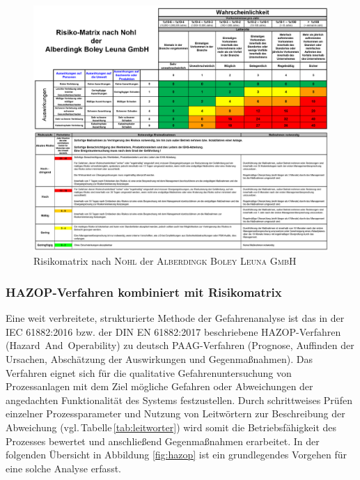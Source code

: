 \begin{figure}[h!]
	\centering
	\includegraphics[width=1.0\textwidth]{img/Risikomatrix}
	\caption{Risikomatrix nach \textsc{Nohl} der \textsc{Alberdingk Boley Leuna GmbH}}
	\label{fig:risikomatrix}
\end{figure}
\FloatBarrier


\subsubsection{HAZOP-Verfahren kombiniert mit Risikomatrix}
Eine weit verbreitete, strukturierte Methode der Gefahrenanalyse ist das in der IEC 61882:2016 bzw. der DIN EN 61882:2017 beschriebene HAZOP-Verfahren \mbox{(Hazard And Operability)} zu deutsch PAAG-Verfahren (Prognose, Auffinden der Ursachen, Abschätzung der Auswirkungen und Gegenmaßnahmen). Das Verfahren eignet sich für die qualitative Gefahrenuntersuchung von Prozessanlagen mit dem Ziel mögliche Gefahren oder Abweichungen der angedachten Funktionalität des Systems festzustellen.  Durch schrittweises Prüfen einzelner Prozessparameter und Nutzung von Leitwörtern zur Beschreibung der Abweichung (vgl.\,Tabelle\,\ref{tab:leitworter}) wird somit die Betriebsfähigkeit des Prozesses bewertet und anschließend Gegenmaßnahmen erarbeitet. \cite{Hauptmanns.2020, UlfSchubert.2020, KenPatterson.2017} \linebreak 
In der folgenden Übersicht in Abbildung \ref{fig:hazop} ist ein grundlegendes Vorgehen für eine solche Analyse erfasst.

